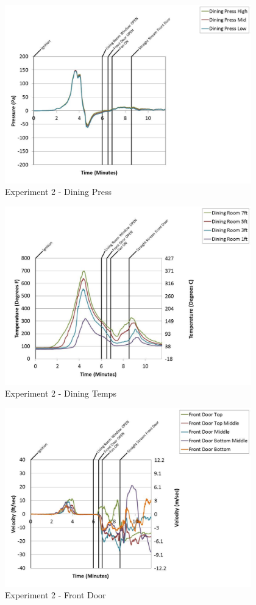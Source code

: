 \documentclass{article}
\begin{document}
\begin{appendices}
	\begin{figure}[h!]
		\centering
		\includegraphics[height=3.05in]{0_Images/Results_Charts/Exp_2_Charts/DiningPress.pdf}
		\caption{Experiment 2 - Dining Press}
	\end{figure}
 
	\clearpage

	\begin{figure}[h!]
		\centering
		\includegraphics[height=3.05in]{0_Images/Results_Charts/Exp_2_Charts/DiningTemps.pdf}
		\caption{Experiment 2 - Dining Temps}
	\end{figure}
 

	\begin{figure}[h!]
		\centering
		\includegraphics[height=3.05in]{0_Images/Results_Charts/Exp_2_Charts/FrontDoor.pdf}
		\caption{Experiment 2 - Front Door}
	\end{figure}
 

\end{appendices}
\end{document}
